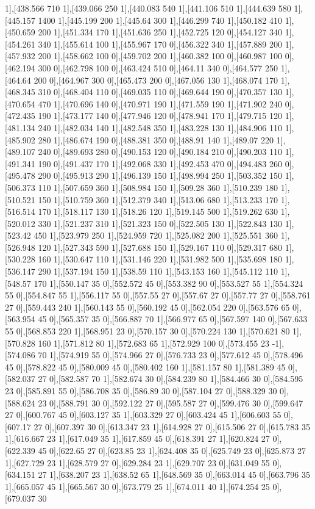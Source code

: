 {1],[438.566 710 1],[439.066 250 1],[440.083 540 1],[441.106 510 1],[444.639 580 1],[445.157 1400 1],[445.199 200 1],[445.64 300 1],[446.299 740 1],[450.182 410 1],[450.659 200 1],[451.334 170 1],[451.636 250 1],[452.725 120 0],[454.127 340 1],[454.261 340 1],[455.614 100 1],[455.967 170 0],[456.322 340 1],[457.889 200 1],[457.932 200 1],[458.662 100 0],[459.702 200 1],[460.382 100 0],[460.987 100 0],[462.194 300 0],[462.798 100 0],[463.424 510 0],[464.11 340 0],[464.577 250 1],[464.64 200 0],[464.967 300 0],[465.473 200 0],[467.056 130 1],[468.074 170 1],[468.345 310 0],[468.404 110 0],[469.035 110 0],[469.644 190 0],[470.357 130 1],[470.654 470 1],[470.696 140 0],[470.971 190 1],[471.559 190 1],[471.902 240 0],[472.435 190 1],[473.177 140 0],[477.946 120 0],[478.941 170 1],[479.715 120 1],[481.134 240 1],[482.034 140 1],[482.548 350 1],[483.228 130 1],[484.906 110 1],[485.902 280 1],[486.674 190 0],[488.381 350 0],[488.91 140 1],[489.07 220 1],[489.107 240 0],[489.693 280 0],[490.153 120 0],[490.184 210 0],[490.203 110 1],[491.341 190 0],[491.437 170 1],[492.068 330 1],[492.453 470 0],[494.483 260 0],[495.478 290 0],[495.913 290 1],[496.139 150 1],[498.994 250 1],[503.352 150 1],[506.373 110 1],[507.659 360 1],[508.984 150 1],[509.28 360 1],[510.239 180 1],[510.521 150 1],[510.759 360 1],[512.379 340 1],[513.06 680 1],[513.233 170 1],[516.514 170 1],[518.117 130 1],[518.26 120 1],[519.145 500 1],[519.262 630 1],[520.012 330 1],[521.237 310 1],[521.323 150 0],[522.505 130 1],[522.843 130 1],[523.42 450 1],[523.979 250 1],[524.959 720 1],[525.082 200 1],[525.551 360 1],[526.948 120 1],[527.343 590 1],[527.688 150 1],[529.167 110 0],[529.317 680 1],[530.228 160 1],[530.647 110 1],[531.146 220 1],[531.982 500 1],[535.698 180 1],[536.147 290 1],[537.194 150 1],[538.59 110 1],[543.153 160 1],[545.112 110 1],[548.57 170 1],[550.147 35 0],[552.572 45 0],[553.382 90 0],[553.527 55 1],[554.324 55 0],[554.847 55 1],[556.117 55 0],[557.55 27 0],[557.67 27 0],[557.77 27 0],[558.761 27 0],[559.443 240 1],[560.143 55 0],[560.192 45 0],[562.054 220 0],[563.576 65 0],[563.954 45 0],[565.357 35 0],[566.887 70 1],[566.977 65 0],[567.597 140 0],[567.633 55 0],[568.853 220 1],[568.951 23 0],[570.157 30 0],[570.224 130 1],[570.621 80 1],[570.828 160 1],[571.812 80 1],[572.683 65 1],[572.929 100 0],[573.455 23 -1],[574.086 70 1],[574.919 55 0],[574.966 27 0],[576.733 23 0],[577.612 45 0],[578.496 45 0],[578.822 45 0],[580.009 45 0],[580.402 160 1],[581.157 80 1],[581.389 45 0],[582.037 27 0],[582.587 70 1],[582.674 30 0],[584.239 80 1],[584.466 30 0],[584.595 23 0],[585.891 55 0],[586.708 35 0],[586.89 30 0],[587.104 27 0],[588.329 30 0],[588.624 23 0],[588.791 30 0],[592.122 27 0],[595.587 27 0],[599.476 30 0],[599.647 27 0],[600.767 45 0],[603.127 35 1],[603.329 27 0],[603.424 45 1],[606.603 55 0],[607.17 27 0],[607.397 30 0],[613.347 23 1],[614.928 27 0],[615.506 27 0],[615.783 35 1],[616.667 23 1],[617.049 35 1],[617.859 45 0],[618.391 27 1],[620.824 27 0],[622.339 45 0],[622.65 27 0],[623.85 23 1],[624.408 35 0],[625.749 23 0],[625.873 27 1],[627.729 23 1],[628.579 27 0],[629.284 23 1],[629.707 23 0],[631.049 55 0],[634.151 27 1],[638.207 23 1],[638.52 65 1],[648.569 35 0],[663.014 45 0],[663.796 35 1],[665.057 45 1],[665.567 30 0],[673.779 25 1],[674.011 40 1],[674.254 25 0],[679.037 30 }
